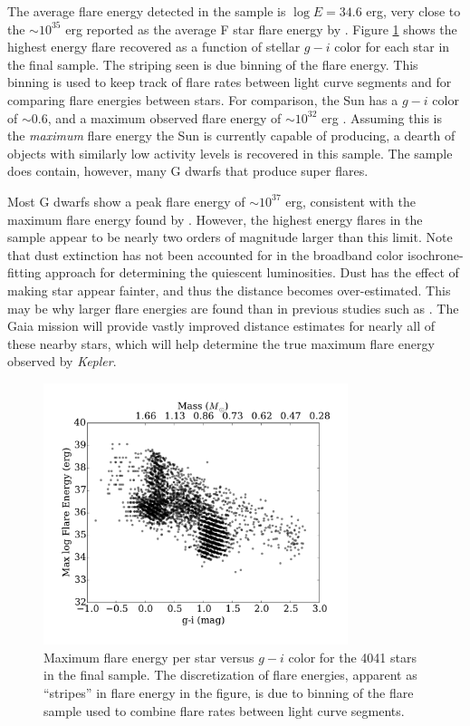 \documentclass[twocolumn]{aastex6}
\newcommand{\Kepler}{\textsl{Kepler}\xspace}
\begin{document}
The average flare energy detected in the sample is $\log E = 34.6$ erg, very close to the $\sim10^{35}$ erg reported as the average F star flare energy by \citet{balona2012}. Figure \ref{fig:maxcolor} shows the highest energy flare recovered as a function of stellar  $g-i$ color for each star in the final sample. The striping seen is due binning of the flare energy. This binning is used to keep track of flare rates between light curve segments  and for comparing flare energies between stars. 
For comparison, the Sun has a $g-i$ color of $\sim$0.6, and a maximum observed flare energy of $\sim$$10^{32}$ erg \citep{emslie2012}.  Assuming this is the {\it maximum} flare energy the Sun is currently capable of producing, a dearth of objects with similarly low activity levels is recovered in this sample. The sample does contain, however, many G dwarfs that produce super flares.





Most G dwarfs show a peak flare energy of $\sim10^{37}$ erg, consistent with the maximum flare energy found by \citet{wu2015}. However, the highest energy flares in the sample appear to be nearly two orders of magnitude larger than this limit. Note that dust extinction has not been accounted for in the broadband color isochrone-fitting approach for determining the quiescent luminosities. Dust has the effect of making star appear fainter, and thus the distance becomes over-estimated. This may be why larger flare energies are found than in previous studies such as \citet{maehara2015}. The Gaia mission \citep{eyer2013} will provide vastly improved distance estimates for nearly all of these nearby stars, which will help determine the true maximum flare energy observed by \Kepler.



\begin{figure}[!t]
\centering
\includegraphics[width=3.5in]{fig5}
\caption{
Maximum flare energy per star versus $g-i$ color for the 4041 stars in the final sample. The discretization of flare energies, apparent as ``stripes'' in flare energy in the figure, is due to binning of the flare sample used to combine flare rates between light curve segments.
}
\label{fig:maxcolor}
\end{figure}
\end{document}
